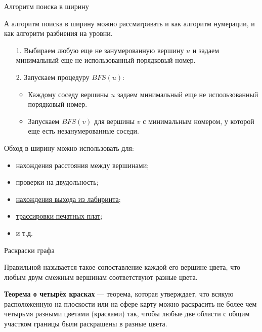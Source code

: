 \begin{frame}{Алгоритм поиска в ширину}

А алгоритм поиска в ширину можно рассматривать и как алгоритм нумерации, и как алгоритм разбиения на уровни. 


\begin{itemize}
\item[1.] Выбираем любую еще не занумерованную вершину $u$ и задаем минимальный еще не использованный порядковый номер.
\item[2.] Запускаем процедуру $BFS(u)$:
\begin{itemize}
\item Каждому соседу вершины $u$ задаем минимальный еще не использованный порядковый номер.
\item Запускаем $BFS(v)$ для вершины $v$ с минимальным номером, у которой еще есть незанумерованные соседи.
\end{itemize}
\end{itemize}

Обход в ширину можно использовать для:
\begin{itemize}
\item нахождения расстояния между вершинами;
\item проверки на двудольность;
\item \href{https://seanperfecto.github.io/BFS-DFS-Pathfinder/}{\color{blue}\underline{нахождения выхода из лабиринта}};
\item \href{https://www.semanticscholar.org/paper/An-Algorithm-for-Path-Connections-and-Its-Lee/6b9cbd70349aac279cb69ffb6017ee6504a729b9}{\color{blue}\underline{трассировки печатных плат}};
\item и т.д.
\end{itemize}

\end{frame}


\begin{frame}{Раскраски графа}

 Правильной  называется такое сопоставление каждой его вершине цвета, что любым двум смежным вершинам соответствуют разные цвета.

\spc
{\bf Теорема о четырёх красках} --- теорема, которая утверждает, что всякую расположенную на плоскости или на сфере карту можно раскрасить не более чем четырьмя разными цветами (красками) так, чтобы любые две области с общим участком границы были раскрашены в разные цвета.

\end{frame}


